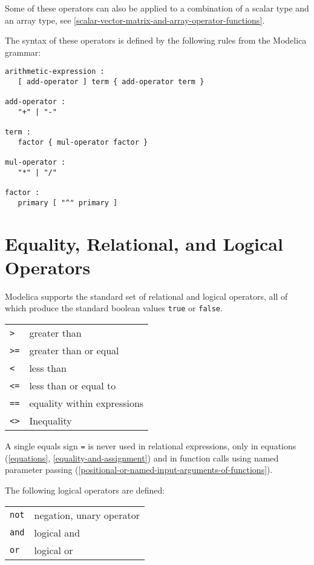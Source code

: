 Some of these operators can also be applied to a combination of a scalar
type and an array type, see \autoref{scalar-vector-matrix-and-array-operator-functions}.

The syntax of these operators is defined by the following rules from the
Modelica grammar:
\begin{lstlisting}[language=grammar]
arithmetic-expression :
   [ add-operator ] term { add-operator term }

add-operator :
   "+" | "-"

term :
   factor { mul-operator factor }

mul-operator :
   "*" | "/"

factor :
   primary [ "^" primary ]
\end{lstlisting}

\section{Equality, Relational, and Logical Operators}

Modelica supports the standard set of relational and logical operators,
all of which produce the standard boolean values \lstinline!true! or \lstinline!false!.


\begin{longtable}[]{ll}
\lstinline!>! & greater than\\
\lstinline!>=! & greater than or equal\\
\lstinline!<! & less than\\
\lstinline!<=! & less than or equal to\\
\lstinline!==! & equality within expressions\\
\lstinline!<>! & Inequality\\
\end{longtable}

A single equals sign \lstinline!=! is never used in relational expressions, only in
equations (\autoref{equations}, \autoref{equality-and-assignment}) and in function calls using named
parameter passing (\autoref{positional-or-named-input-arguments-of-functions}).

The following logical operators are defined:
\begin{longtable}[]{ll}
\lstinline!not! & negation, unary operator\\
\lstinline!and! & logical and\\
\lstinline!or! & logical or\\
\end{longtable}

